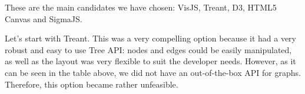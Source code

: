 \documentclass{l4proj}
\begin{document}
\begin{table}[!ht]
\centering
{}
\caption{Table showing features provided by the main drawing libraries for trees/graphs.}
\label{drawing-libraries}
\end{table}

These are the main candidates we have chosen: VisJS, Treant, D3, HTML5 Canvas and SigmaJS. 

Let's start with Treant. This was a very compelling option because it had a very robust and easy to use Tree API: nodes
and edges could be easily manipulated, as well as the layout was very flexible to suit the developer needs. However, as
it can be seen in the table above, we did not have an out-of-the-box API for graphs. Therefore, this option became
rather unfeasible.
\end{document}
